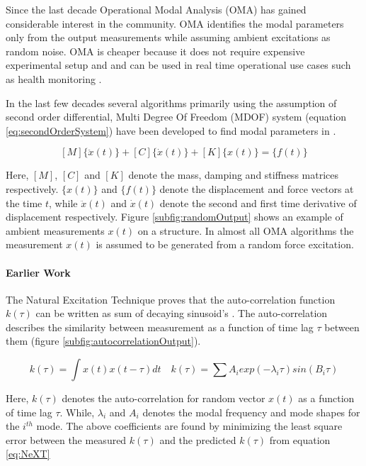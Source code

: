 Since the last decade Operational Modal Analysis (OMA) has gained considerable interest in the community. OMA identifies the modal parameters only from the output measurements while assuming ambient excitations as random noise. OMA is cheaper because it does not require expensive experimental setup and and can be used in real time operational use cases such as health monitoring \cite{peeters2005industrial, shahdin2010correlating, rainieri2007automated}. 

In the last few decades several algorithms primarily using the assumption of second order differential, Multi Degree Of Freedom (MDOF) system (equation \ref{eq:secondOrderSystem}) have been developed to find modal parameters in \cite{guillaume2003poly, richardson1982parameter}.

\begin{equation}\label{eq:secondOrderSystem}
    [M]\{\ddot{x}(t)\} + [C]\{\dot{x}(t)\} + [K]\{x(t)\} = \{f(t)\}
\end{equation}

Here, $[M]$, $[C]$ and $[K]$ denote the mass, damping and stiffness matrices respectively. $\{x(t)\}$ and $\{f(t)\}$ denote the displacement and force vectors at the time $t$, while $\ddot{x}(t)$ and $\dot{x}(t)$ denote the second and first time derivative of displacement respectively. Figure \ref{subfig:randomOutput} shows an example of ambient measurements $x(t)$ on a structure.  In almost all OMA algorithms the measurement $x(t)$ is assumed to be generated from a random force excitation. 

\paragraph{Earlier Work}
The Natural Excitation Technique \cite{james1995natural} proves that the auto-correlation function $k(\tau)$ can be written as sum of decaying sinusoid's \cite{spitznogle1970representation, ibrahim1977method, guillaume2003poly}. The auto-correlation describes the similarity between measurement as a function of time lag $\tau$ between them (figure \ref{subfig:autocorrelationOutput}).  

\begin{equation}\label{eq:NeXT}
    k(\tau) = \int x(t)x(t-\tau)dt \quad k(\tau) = \sum A_{i}exp(-\lambda_{i}\tau)sin(B_{i}\tau)
\end{equation}

Here, $k(\tau)$ denotes the auto-correlation for random vector $x(t)$ as a function of time lag $\tau$. While, $\lambda_{i}$ and $A_{i}$ denotes the modal frequency and mode shapes for the $i^{th}$ mode. The above coefficients are found by minimizing the least square error between the measured $k(\tau)$ and the predicted $k(\tau)$ from equation \ref{eq:NeXT}

